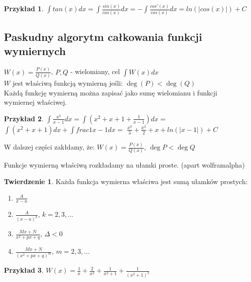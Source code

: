\documentclass{article}
\theoremstyle{definition}
\theoremstyle{definition}
\newtheorem{tw}{Twierdzenie}[subsection]
\theoremstyle{definition}
\newtheorem{pk}{Przykład}[subsection]
\theoremstyle{definition}
\begin{document}
\begin{pk}
    $\int tan(x) dx = \int \frac{sin(x)}{cos(x)} dx = - \int \frac {cos'(x)}{cos(x)} dx = ln(|cos(x)|) + C$
\end{pk}

\subsection{Paskudny algorytm całkowania funkcji wymiernych}
$W(x)=\frac{P(x)}{Q(x)}$, $P, Q$ - wielomiany, cel $\int W(x)dx$\\
$W$ jest właściwą funkcją wymierną jeśli: $\deg(P) < \deg(Q)$\\
Każdą funkcję wymierną można zapisać jako sumę wielomianu i funkcji wymiernej właściwej.

\begin{pk}
    $\int \frac{x^3}{x-1} dx = \int (x^2 + x + 1 + \frac{1}{x-1}) dx=$
    $\int (x^2 + x + 1) dx + \int frac{1}{x-1} dx=$
    $\frac{x^3}{3} + \frac{x^2}{2} + x + ln(|x-1|) + C$
\end{pk}
W dalszej części zakłdamy, że:
$W(x)=\frac{P(x)}{Q(x)}$, $\deg P < \deg Q$

Funkcje wymierną właściwą rozkładamy na ułamki proste. (apart wolframalpha)\\

\begin{tw}
    Każda funkcja wymierna właściwa jest sumą ułamków prostych:
    \begin{enumerate}
        \item $\frac{A}{x-a}$
        \item $\frac{A}{(x-a)^k}$, $k=2, 3, ...$
        \item $\frac{Mx+N}{x^2+px+q}$, $\Delta < 0$
        \item $\frac{Mx+N}{(x^2+px+q)^m}$, $m=2, 3, ...$
    \end{enumerate}
\end{tw}

\begin{pk}
    $W(x) = \frac{1}{x} + \frac{2}{x^2} + \frac{1}{x^2+1} + \frac{1}{(x^2+1)^2}$
\end{pk}
\end{document}
